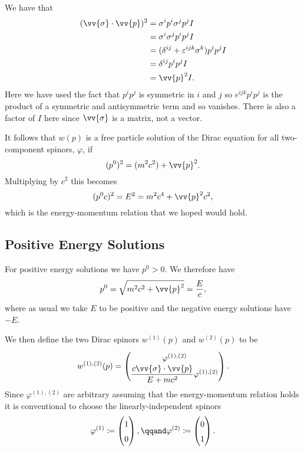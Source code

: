 \documentclass[fleqn]{NotesClass}
\newcommand{\ident}{I}
\begin{document}
    We have that
    \begin{align}
        (\vv{\sigma} \cdot \vv{p})^2 &= \sigma^ip^i\sigma^jp^j\ident\\
        &= \sigma^i\sigma^jp^ip^j\ident\\
        &= (\delta^{ij} + \varepsilon^{ijk}\sigma^k)p^ip^j\ident\\
        &= \delta^{ij}p^ip^j\ident\\
        &= \vv{p}^2\ident.
    \end{align}
    Here we have used the fact that \(p^ip^j\) is symmetric in \(i\) and \(j\) so \(e^{ijk}p^ip^j\) is the product of a symmetric and antisymmetric term and so vanishes.
    There is also a factor of \(\ident\) here since \(\vv{\sigma}\) is a matrix, not a vector.
    
    It follows that \(w(p)\) is a free particle solution of the Dirac equation for all two-component spinors, \(\varphi\), if
    \begin{equation}
        (p^0)^2 = (m^2c^2) + \vv{p}^2.
    \end{equation}
    Multiplying by \(c^2\) this becomes
    \begin{equation}
        (p^0c)^2 = E^2 = m^2c^4 + \vv{p}^2c^2,
    \end{equation}
    which is the energy-momentum relation that we hoped would hold.
    
    \subsection{Positive Energy Solutions}
    For positive energy solutions we have \(p^0 > 0\).
    We therefore have
    \begin{equation}
        p^0 = \sqrt{m^2 c^2 + \vv{p}^2} = \frac{E}{c},
    \end{equation}
    where as usual we take \(E\) to be positive and the negative energy solutions have \(-E\).
    
    We then define the two Dirac spinors \(w^{(1)}(p)\) and \(w^{(2)}(p)\) to be
    \begin{equation}
        w^{(1),(2)}(p) = \renewcommand{\arraystretch}{1.5}
        \begin{pmatrix}
            \varphi^{(1),(2)}\\
            \dfrac{c\vv{\sigma}\cdot\vv{p}}{E + mc^2}\varphi^{(1),(2)}
        \end{pmatrix}
        .
    \end{equation}
    Since \(\varphi^{(1),(2)}\) are arbitrary assuming that the energy-momentum relation holds it is conventional to choose the linearly-independent spinors
    \begin{equation}
        \varphi^{(1)} \coloneqq 
        \begin{pmatrix}
            1\\ 0
        \end{pmatrix}
        , \qqand \varphi^{(2)} \coloneqq
        \begin{pmatrix}
            0\\ 1
        \end{pmatrix}
        .
    \end{equation}
    
\end{document}
